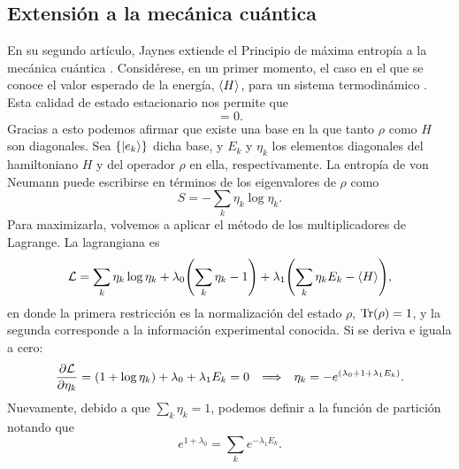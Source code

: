 \subsection{Extensión a la mecánica cuántica}

En su segundo artículo, Jaynes extiende el Principio de máxima entropía a la mecánica cuántica \cite{JaynesII}. Considérese, en un primer momento, el caso en el que se conoce el valor esperado de la energía, $\expval{H}$, para un sistema termodinámico . Esta calidad de estado estacionario nos permite  que
\begin{equation*}
    [\rho,H]=0.
\end{equation*}
Gracias a esto podemos afirmar que existe una base en la que tanto $\rho$ como $H$ son diagonales. Sea $\{\ket{e_{k}}\}$ dicha base, y $E_{k}$ y $\eta_{k}$ los  elementos diagonales del hamiltoniano $H$ y del operador $\rho$ en ella, respectivamente. La entropía de von Neumann puede escribirse en términos de los eigenvalores de $\rho$ como
\begin{equation*}
    S=-\sum_{k}\eta_{k}\log{\eta_{k}}.
\end{equation*}
Para maximizarla, volvemos a aplicar el método de los multiplicadores de Lagrange. La lagrangiana es
\begin{equation*}
    \mathcal{L}=\sum_{k}\eta_{k}\log{\eta_{k}}+\lambda_{0}\qty(\sum_{k}\eta_{k}-1)+\lambda_{1}\qty(\sum_{k}\eta_{k}E_{k}-\expval{H}),
\end{equation*}
en donde la primera restricción es la normalización del estado $\rho$, $\Tr(\rho)=1$, y la segunda corresponde a la información experimental conocida. Si se deriva e iguala a cero:
\begin{align*}
    \frac{\partial \mathcal{L}}{\partial \eta_{k}}=(1+\log{\eta_{k}})+\lambda_{0}+\lambda_{1}E_{k}=0 & & \Longrightarrow  & &\eta_{k}=-e^{(\lambda_{0}+1+\lambda_{1}E_{k})}.
\end{align*}
Nuevamente, debido a que $\sum_{k}\eta_{k}=1$, podemos definir a la función de partición notando que
\begin{equation*}
    e^{1+\lambda_{0}}=\sum_{k}e^{-\lambda_{1}E_{k}}.
\end{equation*}
